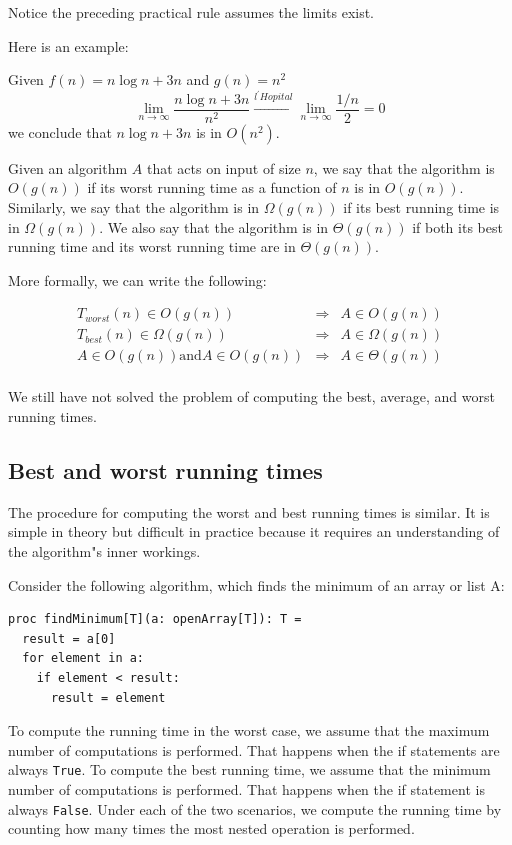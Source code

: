 \documentclass[justified, sixbynine]{tufte-book}
\def\ft{\small\tt}
\theoremstyle{plain}%
\newtheorem * {corollary}{Corollary}
\theoremstyle{definition}
\theoremstyle{remark}
\newtheorem * {remark}{Remark}
\newtheorem * {note}{Note}
\begin{document}
\begin{fullwidth}
Notice the preceding practical rule assumes the limits exist.

Here is an example:

Given $f(n) = n\log n+3n$ and $g(n) = n^2$
\begin{equation}
\lim_{n\rightarrow \infty }\frac{n\log n+3n}{n^2}\stackrel{l^{\prime }Hopital%
}{\longrightarrow }\lim_{n\rightarrow \infty }\frac{1/n}2=0
\end{equation}
we conclude that $n\log n+3n$ is in $O(n^2)$.



Given an algorithm $A$ that acts on input of size $n$, we say that the algorithm is $O(g(n))$ if its worst running time as a function of $n$ is in $O(g(n))$. Similarly, we say that the algorithm is in $\Omega(g(n))$ if its best running time is in $\Omega(g(n))$. We also say that the algorithm is in $ \Theta(g(n))$ if both its best running time and its worst running time are in  $\Theta(g(n))$.

More formally, we can write the following:

\begin{eqnarray}
T_{worst}(n) \in O(g(n)) &\Rightarrow& A \in O(g(n)) \\
T_{best}(n) \in \Omega(g(n)) &\Rightarrow& A \in \Omega(g(n)) \\
A \in O(g(n)) \textrm{and} A \in O(g(n))  &\Rightarrow& A \in \Theta(g(n)) \\
\end{eqnarray}

We still have not solved the problem of computing the best, average, and worst running times.

\goodbreak\subsection{Best and worst running times}

The procedure for computing the worst and best running times is similar. It is simple in theory but difficult in practice because it requires an understanding of the algorithm"s inner workings.

Consider the following algorithm, which finds the minimum of an array or list A:
\begin{lstlisting}
proc findMinimum[T](a: openArray[T]): T =
  result = a[0]
  for element in a:
    if element < result:
      result = element
\end{lstlisting}


To compute the running time in the worst case, we assume that the maximum number of computations is performed. That happens when the if statements are always {\ft True}. To compute the best running time, we assume that the minimum number of computations is performed. That happens when the if statement is always {\ft False}.
Under each of the two scenarios, we compute the running time by counting how many times the most nested operation is performed.


\end{fullwidth}
\end{document}
